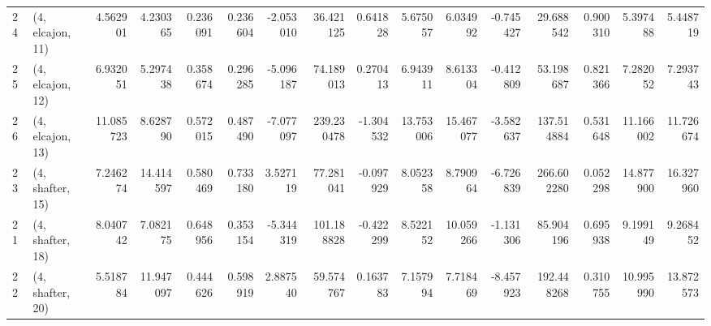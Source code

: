 \begin{tabular}{llrrrrrrrrrrrrrr}
24 &  (4, elcajon, 11) &   4.562901 &   4.230365 &   0.236091 &  0.236604 & -2.053010 &   36.421125 &  0.641828 &   5.675057 &   6.034992 &  -0.745427 &   29.688542 &  0.900310 &   5.397488 &   5.448719 \\
25 &  (4, elcajon, 12) &   6.932051 &   5.297438 &   0.358674 &  0.296285 & -5.096187 &   74.189013 &  0.270413 &   6.943911 &   8.613304 &  -0.412809 &   53.198687 &  0.821366 &   7.282052 &   7.293743 \\
26 &  (4, elcajon, 13) &  11.085723 &   8.628790 &   0.572015 &  0.487490 & -7.077097 &  239.230478 & -1.304532 &  13.753006 &  15.467077 &  -3.582637 &  137.514884 &  0.531648 &  11.166002 &  11.726674 \\
23 &  (4, shafter, 15) &   7.246274 &  14.414597 &   0.580469 &  0.733180 &  3.527119 &   77.281041 & -0.097929 &   8.052358 &   8.790964 &  -6.726839 &  266.602280 &  0.052298 &  14.877900 &  16.327960 \\
21 &  (4, shafter, 18) &   8.040742 &   7.082175 &   0.648956 &  0.353154 & -5.344319 &  101.188828 & -0.422299 &   8.522152 &  10.059266 &  -1.131306 &   85.904196 &  0.695938 &   9.199149 &   9.268452 \\
22 &  (4, shafter, 20) &   5.518784 &  11.947097 &   0.444626 &  0.598919 &  2.887540 &   59.574767 &  0.163783 &   7.157994 &   7.718469 &  -8.457923 &  192.448268 &  0.310755 &  10.995990 &  13.872573 \\
\bottomrule
\end{tabular}

